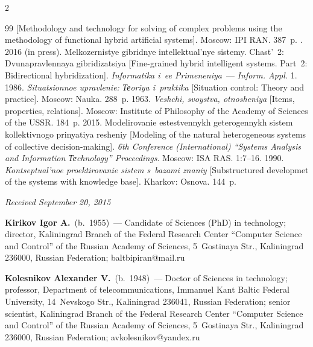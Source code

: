 \begin{multicols}{2}
{{\begin{thebibliography}{99}
[Methodology and technology for solving of complex problems using the methodology of 
functional hybrid artificial systems]. Moscow: IPI RAN. 387~p.
. 2016 (in press). 
Melkozernistye gibridnye intellektual'nye sistemy. Chast'~2:
Dvunapravlennaya gibridizatsiya 
[Fine-grained hybrid intelligent
  systems. Part~2: Bidirectional hybridization]. 
  \textit{Informatika i~ee Primeneniya}~--- \textit{Inform. Appl.} 1.
 1986. \textit{Situatsionnoe upravlenie: Теoriya i~praktika} [Situation 
control: Theory and practice]. Moscow: Nauka. 288~p.
 1963. \textit{Veshchi, svoystva, otnosheniya} [Items, properties, relations]. 
Moscow: Institute of Philosophy of the Academy of Sciences of the USSR. 184~p.
 2015. Modelirovanie estestvennykh geterogennykh sistem kollektivnogo 
prinyatiya resheniy [Modeling of the natural heterogeneous systems of collective decision-making]. 
\textit{6th 
Conference (International) ``Systems Analysis and Information Теchnology'' Proceedings}. 
Moscow: ISA RAS. 1:7--16.
 1990. \textit{Kontseptual'noe proektirovanie sistem s~bazami znaniy} 
[Substructured developmet of the systems with knowledge base]. Kharkov: Osnova. 144~p.
\end{thebibliography}

 }
 }

\end{multicols}

\vspace*{-3pt}

\hfill{\small\textit{Received September 20, 2015}}

\Contr

\noindent
\textbf{Kirikov Igor A.}\ (b.\ 1955)~---
Candidate of  Sciences (PhD) in technology; director, Kaliningrad Branch of the 
Federal Research Center ``Computer Science and Control'' of the Russian Academy 
of Sciences, 5~Gostinaya Str., Kaliningrad 236000,  Russian Federation; baltbipiran@mail.ru

\vspace*{3pt}

\noindent
\textbf{Kolesnikov Alexander V.}\ (b.\ 1948)~---
Doctor of Sciences in technology; professor, Department of telecommunications, 
Immanuel Kant Baltic Federal University, 14~Nevskogo Str., Kaliningrad 236041,
Russian Federation; senior scientist, Kaliningrad Branch of 
the Federal Research Center ``Computer Science and Control'' of the Russian 
Academy of Sciences, 5~Gostinaya Str., Kaliningrad 236000,  Russian Federation; avkolesnikov@yandex.ru

